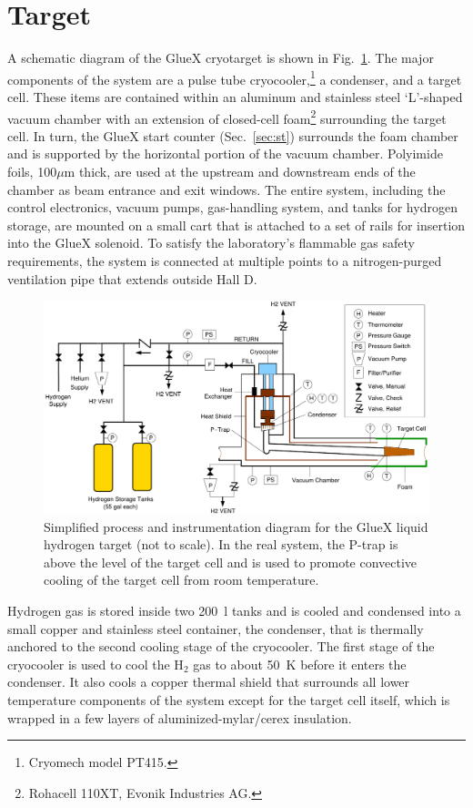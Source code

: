 \section[Target]{Target \label{sec:target} }
A schematic diagram of the GlueX cryotarget is shown in Fig.~\ref{fig:Target}.  
The major components of the system are a pulse tube cryocooler,\footnote{Cryomech model PT415.}
a condenser, and a target cell.  These items are contained within
an aluminum and stainless steel `L'-shaped vacuum chamber
with an extension of closed-cell foam\footnote{Rohacell 110XT, Evonik Industries AG.}
surrounding the target cell.
In turn, the GlueX start counter (Sec.~\ref{sec:st}) surrounds the
foam chamber and is supported by the horizontal portion of the vacuum chamber.
Polyimide foils, 100$\mu$m thick, are used at the upstream and downstream ends of the
chamber as beam entrance and exit windows.
The entire system, including the control electronics, vacuum pumps,
gas-handling system, and tanks for hydrogen
storage, are mounted on a small cart that is attached to a set of rails for
insertion into the GlueX solenoid.  To satisfy the laboratory's flammable gas safety requirements,
the system is connected at multiple points to a nitrogen-purged ventilation pipe that
extends outside Hall D. 
\begin{figure}
\begin{center}
\includegraphics[width=4.5in]{figures/TargetSchematic2.pdf}
\end{center}
\caption{Simplified process and instrumentation diagram for the GlueX liquid hydrogen target (not to scale).
In the real system, the P-trap is above the level of the target cell and is used to
promote convective cooling of the target cell from room temperature.}
\label{fig:Target}
\end{figure}

Hydrogen gas is stored inside two 200~l tanks and
is cooled and condensed into a small copper and stainless steel container,
the condenser, that is thermally anchored to the second cooling stage of the cryocooler. 
The first stage of the cryocooler is used to
cool the H$_2$ gas to about 50~K before it enters the condenser.
It also cools a copper thermal shield that surrounds all
lower temperature components of the system except for the
target cell itself, which is wrapped in a few layers of aluminized-mylar/cerex insulation.

